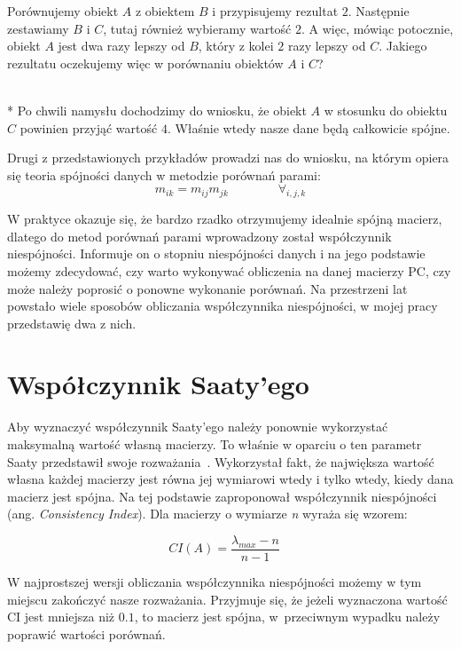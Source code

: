 \begin{example}Porównujemy obiekt $A$ z obiektem $B$ i przypisujemy rezultat $2$. Następnie zestawiamy $B$ i $C$, tutaj również wybieramy wartość $2$. A więc, mówiąc potocznie, obiekt $A$ jest dwa razy lepszy od $B$, który z kolei $2$ razy lepszy od $C$. Jakiego rezultatu oczekujemy więc w porównaniu obiektów $A$ i $C$?\end{example}
\\*
Po chwili namysłu dochodzimy do wniosku, że obiekt $A$ w stosunku do obiektu $C$ powinien przyjąć wartość $4$. Właśnie wtedy nasze dane będą całkowicie spójne.

Drugi z przedstawionych przykładów prowadzi nas do wniosku, na którym opiera się teoria spójności danych w metodzie porównań parami:
\begin{equation}  \label{eq:1} m_{ik} = m_{ij}m_{jk} \quad \quad \quad \quad \forall_{i,j,k} \end{equation}

W praktyce okazuje się, że bardzo rzadko otrzymujemy idealnie spójną macierz, dlatego do metod porównań parami wprowadzony został współczynnik niespójności. Informuje on o stopniu niespójności danych i na jego podstawie możemy zdecydować, czy warto wykonywać obliczenia na danej macierzy PC, czy może należy poprosić o ponowne wykonanie porównań. Na przestrzeni lat powstało wiele sposobów obliczania współczynnika niespójności, w mojej pracy przedstawię dwa z nich.

\section{Współczynnik Saaty’ego}
\label{subsec:saaty}

Aby wyznaczyć współczynnik Saaty’ego należy ponownie wykorzystać maksymalną wartość własną macierzy. To właśnie w oparciu o ten parametr Saaty przedstawił swoje rozważania~\cite{A10}. Wykorzystał fakt, że największa wartość własna każdej macierzy jest równa jej wymiarowi wtedy i tylko wtedy, kiedy dana macierz jest spójna. Na tej podstawie zaproponował współczynnik niespójności (ang. \textit{Consistency Index}). Dla macierzy o wymiarze \textit{n} wyraża się wzorem:

	$$CI(A) =  \frac{ \lambda_{max} - n}{n-1} \quad $$

W najprostszej wersji obliczania współczynnika niespójności możemy w tym miejscu zakończyć nasze rozważania. Przyjmuje się, że jeżeli wyznaczona wartość CI jest mniejsza niż $0.1$, to macierz jest spójna, w~przeciwnym wypadku należy poprawić wartości porównań. 
	
